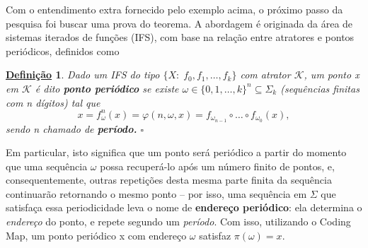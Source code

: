 \documentclass[12pt]{article}
\newtheorem*{def*}{\underline{Definição}}
\theoremstyle{definition}
\begin{document}
Com o entendimento extra fornecido pelo exemplo acima, o próximo passo da pesquisa foi buscar uma prova do teorema. A abordagem é originada da área de sistemas iterados de funções (IFS), com base na relação entre atratores e pontos periódicos, definidos como
\begin{def*}
	Dado um IFS do tipo \(\{X:\; f_0, f_1,\dotsc , f_{k}\}\) com atrator \(\mathcal{K}\), um ponto x em \(\mathcal{K}\) é dito \textbf{ponto periódico} se existe \(\omega \in \{0,1, \dotsc , k\}^{n}\subseteq \Sigma_{k}\) (sequências finitas com n dígitos) tal que
	\[
		x = f_{\omega }^{n}(x) = \varphi (n, \omega , x) = f_{\omega_{n-1}}\circ \dotsc \circ f_{\omega_{0}}(x),
	\]
	sendo n chamado de \textbf{período.} \(\square\)
\end{def*}
Em particular, isto significa que um ponto será periódico a partir do momento que uma sequência \(\omega \) possa recuperá-lo após um número finito de pontos, e, consequentemente, outras repetições desta mesma parte finita da sequência continuarão retornando o mesmo ponto -- por isso, uma sequência em \(\Sigma \) que satisfaça essa periodicidade leva o nome de \textbf{endereço periódico}: ela determina o \textit{endereço} do ponto, e repete segundo um \textit{período}. Com isso, utilizando o Coding Map, um ponto periódico x com endereço \(\omega \) satisfaz \(\pi (\omega ) = x.\)
\end{document}
